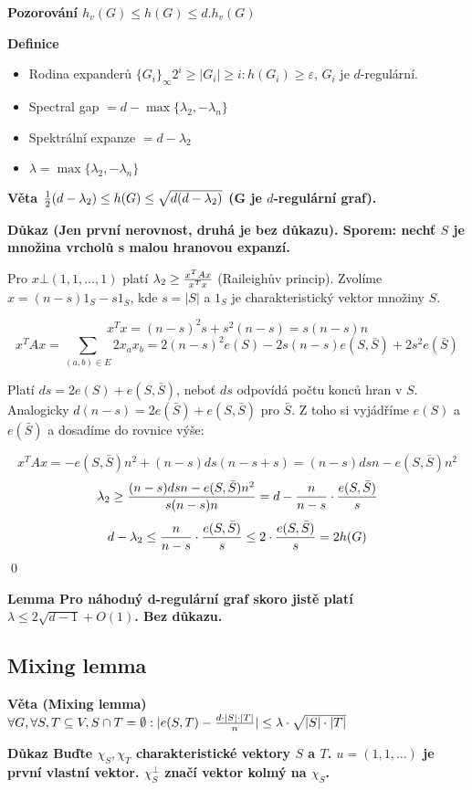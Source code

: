 \documentclass[a4paper,12pt,titlepage]{article}
\newcommand{\lm}{\smallskip\noindent\bf Lemma\rm{} }
\newcommand{\dk}{\smallskip\noindent\bf Důkaz\rm{} }
\newcommand{\df}{\smallskip\noindent\bf Definice\rm{} }
\newcommand{\vt}{\smallskip\noindent\bf Věta\rm{} }
\newcommand{\poz}{\smallskip\noindent\bf Pozorování\rm{} }
\begin{document}
\poz $h_v(G) \le h(G) \le d . h_v(G)$

\df 
\begin{itemize}
	\item Rodina expanderů $\{G_i\}_\infty$\quad$2^i \ge |G_i| \ge i: h(G_i) \ge \varepsilon$, $G_i$ je $d$-regulární.
	\item Spectral gap $= d - \max\{\lambda_2,-\lambda_n\}$
	\item Spektrální expanze $= d - \lambda_2$
	\item $\lambda = \max\{\lambda_2,-\lambda_n\}$
\end{itemize}

\vt ${1\over 2}(d-\lambda_2) \le h(G) \le \sqrt{d(d-\lambda_2)}$ (G je $d$-regulární graf).

\dk (Jen první nerovnost, druhá je bez důkazu). Sporem: nechť $S$ je množina
vrcholů s malou hranovou expanzí.

Pro $x \bot (1,1,\dots,1)$ platí $\lambda_2 \ge {x^TAx\over x^Tx}$ (Raileighův
princip). Zvolíme $x = (n-s)1_S - s1_{\bar S}$, kde $s = |S|$ a $1_S$ je
charakteristický vektor množiny $S$.

$$x^Tx = (n-s)^2s + s^2(n-s) = s(n-s)n$$
$$x^TAx = \sum_{(a,b)\in E} 2x_ax_b = 2(n-s)^2e(S)-2s(n-s)e(S,\bar S) + 2s^2e(\bar S)$$

Platí $ds = 2e(S) + e(S,\bar S)$, neboť $ds$ odpovídá počtu konců hran v $S$. Analogicky $d(n-s) = 2e(\bar S) + e(S,\bar S)$ pro $\bar S$. Z toho si vyjádříme $e(S)$ a $e(\bar S)$ a dosadíme do rovnice výše:

$$x^TAx = -e(S,\bar S)n^2 + (n-s)ds(n-s+s) = (n-s)dsn - e(S,\bar S)n^2$$
$$\lambda_2 \ge {(n-s)dsn - e(S,\bar S)n^2 \over s(n-s)n} = d - {n\over n-s}\cdot{e(S,\bar S)\over s}$$
$$d-\lambda_2 \le {n\over n-s} \cdot {e(S,\bar S)\over s} \le 2\cdot{e(S,\bar S)\over s} = 2h(G)$$
\qed

\lm Pro náhodný d-regulární graf skoro jistě platí $\lambda \le 2\sqrt{d-1} + O(1)$. Bez důkazu.

\subsection{Mixing lemma}
\vt (Mixing lemma) $\forall G, \forall S,T \subseteq V, S\cap T = \emptyset: |e(S,T) - {d\cdot|S|\cdot|T|\over n}| \le \lambda\cdot\sqrt{|S|\cdot|T|}$

\dk Buďte $\chi_S, \chi_T$ charakteristické vektory $S$ a $T$. $u = (1,1,\dots)$ je první vlastní vektor. $\chi_S^\bot$ značí vektor kolmý na $\chi_S$.
\end{document}
